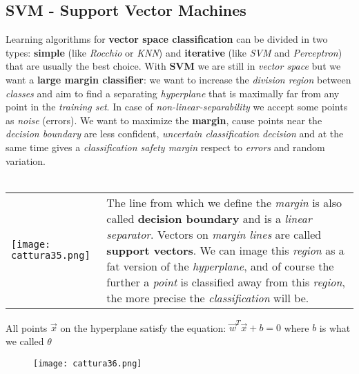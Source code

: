 \documentclass{article}
\begin{document}
\subsection{SVM - Support Vector Machines}
Learning algorithms for \textbf{vector space classification} can be divided in two types: \textbf{simple} (like \emph{Rocchio} or \emph{KNN}) and \textbf{iterative} (like \emph{SVM} and \emph{Perceptron}) that are usually the best choice. With \textbf{SVM} we are still in \emph{vector space} but we want a \textbf{large margin classifier}: we want to increase the \emph{division region} between \emph{classes} and aim to find a separating \emph{hyperplane} that is maximally far from any point in the \emph{training set}. In case of \emph{non-linear-separability} we accept some points as \emph{noise} (errors). We want to maximize the \textbf{margin}, cause points near the \emph{decision boundary} are less confident, \emph{uncertain classification decision} and at the same time gives a \emph{classification safety margin} respect to \emph{errors} and random variation. \\\\
\begin{tabular}{L{10cm} C{5cm}}
\texttt{[image: cattura35.png]} &
The line from which we define the \emph{margin} is also called \textbf{decision boundary} and is a \emph{linear separator}. Vectors on \emph{margin lines} are called \textbf{support vectors}. We can image this \emph{region} as a fat version of the \emph{hyperplane}, and of course the further a \emph{point} is classified away from this \emph{region}, the more precise the \emph{classification} will be.
\end{tabular}
All points $\vec{x}$ on the hyperplane satisfy the equation: $\vec{w}^T\vec{x} + b = 0$ where $b$ is what we called $\theta$
\begin{figure}[H]
  \centering
  \texttt{[image: cattura36.png]}
\end{figure}
\end{document}
